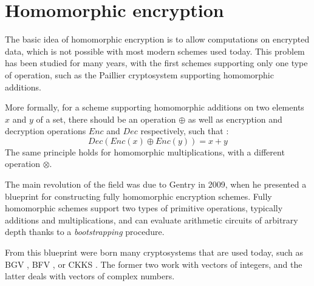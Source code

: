 \documentclass[a4paper,11pt,oneside]{report}
\begin{document}
\section{Homomorphic encryption}\label{sec:background_he}

The basic idea of homomorphic encryption is to allow computations on encrypted data, which is not possible with most modern schemes used today. 
This problem has been studied for many years, with the first schemes supporting only one type of operation, such as the Paillier \cite{paillier_public-key_1999} cryptosystem supporting homomorphic additions. 

More formally, for a scheme supporting homomorphic additions on two elements $x$ and $y$ of a set, there should be an operation $\oplus$ as well as encryption and decryption operations $Enc$ and $Dec$ respectively, such that : 
\begin{equation}\label{eq:homomorphic_add}
  Dec(Enc(x) \oplus Enc(y)) = x + y
\end{equation}
The same principle holds for homomorphic multiplications, with a different operation $\otimes$.

The main revolution of the field was due to Gentry \cite{gentry_fully_2009} in 2009, when he presented a blueprint for constructing fully homomorphic encryption schemes. 
Fully homomorphic schemes support two types of primitive operations, typically additions and multiplications, and can evaluate arithmetic circuits of arbitrary depth thanks to a \emph{bootstrapping} procedure.

From this blueprint were born many cryptosystems that are used today, such as BGV \cite{brakerski_leveled_2012}, BFV \cite{fan_somewhat_2012}, or CKKS \cite{cheon_homomorphic_2017, cheon_full_2019}. 
The former two work with vectors of integers, and the latter deals with vectors of complex numbers.
\end{document}
